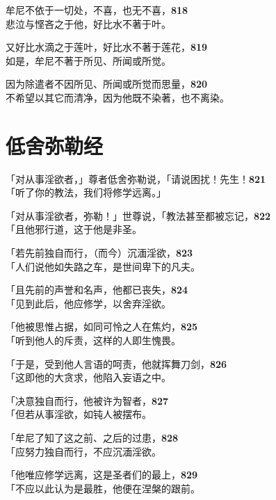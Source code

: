 牟尼不依于一切处，不喜，也无不喜，\hfill{\grayfootnotesize \textbf{818}} \\
悲泣与悭吝之于他，好比水不著于叶。


又好比水滴之于莲叶，好比水不著于莲花，\hfill{\grayfootnotesize \textbf{819}} \\
如是，牟尼不著于所见、所闻或所觉。


因为除遣者不因所见、所闻或所觉而思量，\hfill{\grayfootnotesize \textbf{820}} \\
不希望以其它而清净，因为他既不染著，也不离染。


\section{低舍弥勒经}


「对从事淫欲者，」尊者低舍弥勒说，「请说困扰！先生！\hfill{\grayfootnotesize \textbf{821}} \\
「听了你的教法，我们将修学远离。」


「对从事淫欲者，弥勒！」世尊说，「教法甚至都被忘记，\hfill{\grayfootnotesize \textbf{822}} \\
「且他邪行道，这于他是非圣。


「若先前独自而行，（而今）沉湎淫欲，\hfill{\grayfootnotesize \textbf{823}} \\
「人们说他如失路之车，是世间卑下的凡夫。


「且先前的声誉和名声，他都已丧失，\hfill{\grayfootnotesize \textbf{824}} \\
「见到此后，他应修学，以舍弃淫欲。


「他被思惟占据，如同可怜之人在焦灼，\hfill{\grayfootnotesize \textbf{825}} \\
「听到他人的斥责，这样的人即生愧畏。


「于是，受到他人言语的呵责，他就挥舞刀剑，\hfill{\grayfootnotesize \textbf{826}} \\
「这即他的大贪求，他陷入妄语之中。


「决意独自而行，他被许为智者，\hfill{\grayfootnotesize \textbf{827}} \\
「但若从事淫欲，如钝人被摆布。


「牟尼了知了这之前、之后的过患，\hfill{\grayfootnotesize \textbf{828}} \\
「应努力独自而行，不应沉湎淫欲。


「他唯应修学远离，这是圣者们的最上，\hfill{\grayfootnotesize \textbf{829}} \\
「不应以此认为是最胜，他便在涅槃的跟前。


